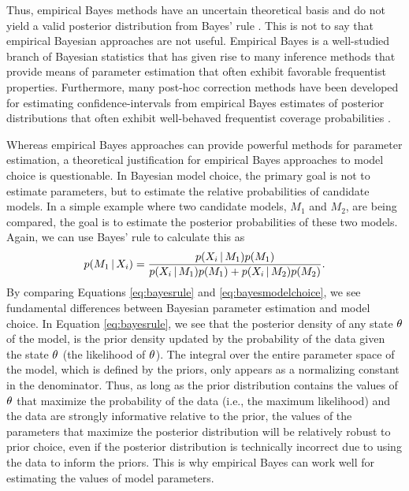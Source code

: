 \documentclass[letterpaper,12pt]{article}
\begin{document}
\begin{linenumbers}
Thus, empirical Bayes methods have an uncertain theoretical basis and
do not yield a valid posterior distribution from Bayes' rule \citep[e.g.,
empirical Bayesian estimates of the posterior are often too narrow, off-center,
and incorrectly shaped;][]{Morris1983,Laird1987,Carlin1990,Efron2013}.
This is not to say that empirical Bayesian approaches are not useful.
Empirical Bayes is a well-studied branch of Bayesian statistics that has given
rise to many inference methods that provide means of
parameter estimation that often exhibit favorable frequentist properties.
Furthermore, many post-hoc correction methods have been developed for
estimating confidence-intervals from empirical Bayes estimates of posterior
distributions that often exhibit well-behaved frequentist coverage
probabilities
\citep{Morris1983,Laird1987,Laird1989, Carlin1990,Hwang2009}.

Whereas empirical Bayes approaches can provide powerful methods for parameter
estimation, a theoretical justification for empirical Bayes approaches to model
choice is questionable.
In Bayesian model choice, the primary goal is not to estimate parameters, but
to estimate the relative probabilities of candidate models.
In a simple example where two candidate models, $M_1$ and $M_2$, are being
compared, the goal is to estimate the posterior probabilities of these two
models.
Again, we can use Bayes' rule to calculate this as
\begin{equation}
    p(M_1 \given \alignment{i}{}) = \frac{p(\alignment{i}{} \given
    M_1)p(M_1)}{p(\alignment{i}{} \given M_1)p(M_1) + p(\alignment{i}{} \given
    M_2)p(M_2)}.
    \label{eq:bayesmodelchoice}
\end{equation}
By comparing Equations \ref{eq:bayesrule} and \ref{eq:bayesmodelchoice}, we
see fundamental differences between Bayesian parameter estimation and
model choice.
In Equation \ref{eq:bayesrule}, we see that the posterior density of any
state $\theta_{}$ of the model, is the prior density updated by the
probability of the data given the state $\theta_{}$ (the likelihood of
$\theta_{}$).
The integral over the entire parameter space of the model, which is defined by
the priors, only appears as a normalizing constant in the denominator.
Thus, as long as the prior distribution contains the values of $\theta_{}$
that maximize the probability of the data (i.e., the maximum likelihood) and
the data are strongly informative relative to the prior, the values of the
parameters that maximize the posterior distribution will be relatively robust
to prior choice, even if the posterior distribution is technically incorrect
due to using the data to inform the priors.
This is why empirical Bayes can work well for estimating the values of model
parameters.


\end{linenumbers}
\end{document}
